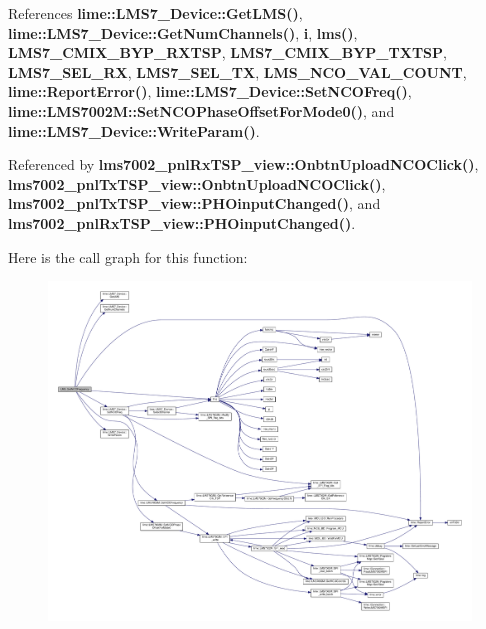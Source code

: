 References {\bf lime\+::\+L\+M\+S7\+\_\+\+Device\+::\+Get\+L\+M\+S()}, {\bf lime\+::\+L\+M\+S7\+\_\+\+Device\+::\+Get\+Num\+Channels()}, {\bf i}, {\bf lms()}, {\bf L\+M\+S7\+\_\+\+C\+M\+I\+X\+\_\+\+B\+Y\+P\+\_\+\+R\+X\+T\+SP}, {\bf L\+M\+S7\+\_\+\+C\+M\+I\+X\+\_\+\+B\+Y\+P\+\_\+\+T\+X\+T\+SP}, {\bf L\+M\+S7\+\_\+\+S\+E\+L\+\_\+\+RX}, {\bf L\+M\+S7\+\_\+\+S\+E\+L\+\_\+\+TX}, {\bf L\+M\+S\+\_\+\+N\+C\+O\+\_\+\+V\+A\+L\+\_\+\+C\+O\+U\+NT}, {\bf lime\+::\+Report\+Error()}, {\bf lime\+::\+L\+M\+S7\+\_\+\+Device\+::\+Set\+N\+C\+O\+Freq()}, {\bf lime\+::\+L\+M\+S7002\+M\+::\+Set\+N\+C\+O\+Phase\+Offset\+For\+Mode0()}, and {\bf lime\+::\+L\+M\+S7\+\_\+\+Device\+::\+Write\+Param()}.



Referenced by {\bf lms7002\+\_\+pnl\+Rx\+T\+S\+P\+\_\+view\+::\+Onbtn\+Upload\+N\+C\+O\+Click()}, {\bf lms7002\+\_\+pnl\+Tx\+T\+S\+P\+\_\+view\+::\+Onbtn\+Upload\+N\+C\+O\+Click()}, {\bf lms7002\+\_\+pnl\+Tx\+T\+S\+P\+\_\+view\+::\+P\+H\+Oinput\+Changed()}, and {\bf lms7002\+\_\+pnl\+Rx\+T\+S\+P\+\_\+view\+::\+P\+H\+Oinput\+Changed()}.



Here is the call graph for this function\+:
\nopagebreak
\begin{figure}[H]
\begin{center}
\leavevmode
\includegraphics[width=350pt]{df/de1/lms7__api_8cpp_ab14f8727a406a5e550828dde1db3fb15_cgraph}
\end{center}
\end{figure}




